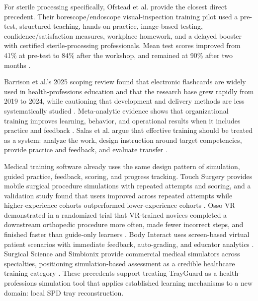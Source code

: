 \documentclass[10pt,a4paper]{article}
\begin{document}
For sterile processing specifically, Ofstead et al. provide the closest direct precedent. Their borescope/endoscope visual-inspection training pilot used a pre-test, structured teaching, hands-on practice, image-based testing, confidence/satisfaction measures, workplace homework, and a delayed booster with certified sterile-processing professionals. Mean test scores improved from 41\% at pre-test to 84\% after the workshop, and remained at 90\% after two months \cite{ofstead-et-al-2023}.

Barrison et al.'s 2025 scoping review found that electronic flashcards are widely used in health-professions education and that the research base grew rapidly from 2019 to 2024, while cautioning that development and delivery methods are less systematically studied \cite{barrison-et-al-2025}. Meta-analytic evidence shows that organizational training improves learning, behavior, and operational results when it includes practice and feedback \cite{arthur-et-al-2003}. Salas et al. argue that effective training should be treated as a system: analyze the work, design instruction around target competencies, provide practice and feedback, and evaluate transfer \cite{salas-et-al-2012}.

Medical training software already uses the same design pattern of simulation, guided practice, feedback, scoring, and progress tracking. Touch Surgery provides mobile surgical procedure simulations with repeated attempts and scoring, and a validation study found that users improved across repeated attempts while higher-experience cohorts outperformed lower-experience cohorts \cite{tulipan-et-al-2019}. Osso VR demonstrated in a randomized trial that VR-trained novices completed a downstream orthopedic procedure more often, made fewer incorrect steps, and finished faster than guide-only learners \cite{orland-et-al-2020}. Body Interact uses screen-based virtual patient scenarios with immediate feedback, auto-grading, and educator analytics \cite{wolters-kluwer-body-interact-accessed-2026}. Surgical Science and Simbionix provide commercial medical simulators across specialties, positioning simulation-based assessment as a credible healthcare training category \cite{surgical-science-simulators-accessed-2026}. These precedents support treating TrayGuard as a health-professions simulation tool that applies established learning mechanisms to a new domain: local SPD tray reconstruction.
\end{document}
